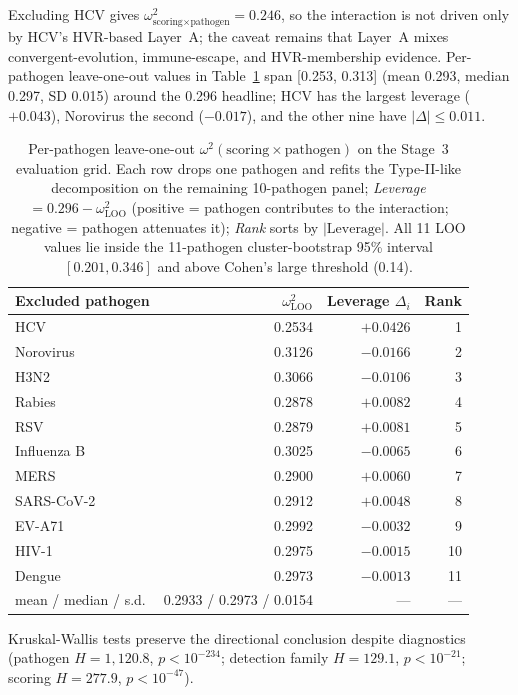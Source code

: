 Excluding HCV gives $\omega^2_{\text{scoring}\times\text{pathogen}}=0.246$, so the interaction is not driven only by HCV's HVR-based Layer~A; the caveat remains that Layer~A mixes convergent-evolution, immune-escape, and HVR-membership evidence. Per-pathogen leave-one-out values in Table~\ref{tab:omega_loo_pathogen_sensitivity} span [0.253, 0.313] (mean 0.293, median 0.297, SD 0.015) around the 0.296 headline; HCV has the largest leverage ($+0.043$), Norovirus the second ($-0.017$), and the other nine have $|\Delta|\leq0.011$.

\begin{table}[h]
\centering
\small
\caption[Per-pathogen leave-one-out $\omega^2$ sensitivity]{Per-pathogen leave-one-out $\omega^2(\text{scoring} \times \text{pathogen})$ on the Stage~3 evaluation grid. Each row drops one pathogen and refits the Type-II-like decomposition on the remaining 10-pathogen panel; \emph{Leverage} $= 0.296 - \omega^2_{\text{LOO}}$ (positive = pathogen contributes to the interaction; negative = pathogen attenuates it); \emph{Rank} sorts by $|\text{Leverage}|$. All 11 LOO values lie inside the 11-pathogen cluster-bootstrap 95\% interval $[0.201, 0.346]$ and above Cohen's large threshold (0.14).}
\label{tab:omega_loo_pathogen_sensitivity}
\begin{tabular}{lrrr}
\toprule
Excluded pathogen & $\omega^2_{\text{LOO}}$ & Leverage $\Delta_i$ & Rank \\
\midrule
HCV          & 0.2534 & $+0.0426$ & 1 \\
Norovirus    & 0.3126 & $-0.0166$ & 2 \\
H3N2         & 0.3066 & $-0.0106$ & 3 \\
Rabies       & 0.2878 & $+0.0082$ & 4 \\
RSV          & 0.2879 & $+0.0081$ & 5 \\
Influenza B  & 0.3025 & $-0.0065$ & 6 \\
MERS         & 0.2900 & $+0.0060$ & 7 \\
SARS-CoV-2   & 0.2912 & $+0.0048$ & 8 \\
EV-A71       & 0.2992 & $-0.0032$ & 9 \\
HIV-1        & 0.2975 & $-0.0015$ & 10 \\
Dengue       & 0.2973 & $-0.0013$ & 11 \\
\midrule
mean / median / s.d. & 0.2933 / 0.2973 / 0.0154 & --- & --- \\
\bottomrule
\end{tabular}
\end{table}
Kruskal-Wallis tests preserve the directional conclusion despite diagnostics (pathogen $H=1{,}120.8$, $p<10^{-234}$; detection family $H=129.1$, $p<10^{-21}$; scoring $H=277.9$, $p<10^{-47}$).

